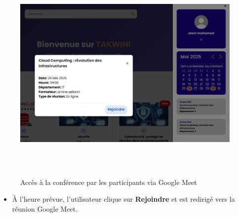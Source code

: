 \documentclass{article}
\begin{document}
\begin{figure}[H]
  \centering
  \includegraphics[height=11cm]{REJ-CONF.png}
  \caption{Accès à la conférence par les participants via Google Meet}
  \label{fig:rejoindre}
\end{figure}

\begin{itemize}
    \item À l’heure prévue, l’utilisateur clique sur \textbf{Rejoindre} et est redirigé vers la réunion Google Meet.
\end{itemize}
\end{document}
